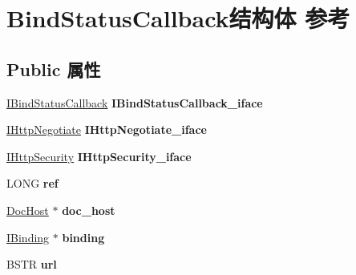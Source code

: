 \hypertarget{struct_bind_status_callback}{}\section{Bind\+Status\+Callback结构体 参考}
\label{struct_bind_status_callback}
\subsection*{Public 属性}
\begin{DoxyCompactItemize}
\item 
\mbox{\label{struct_bind_status_callback_a4fa12afa67f82f9e3957b86cefe82160}} 
\hyperlink{interface_i_bind_status_callback}{I\+Bind\+Status\+Callback} {\bfseries I\+Bind\+Status\+Callback\+\_\+iface}
\item 
\mbox{\label{struct_bind_status_callback_ac8dbbffa0fe5e1d6de41e267f44ee86f}} 
\hyperlink{interface_i_http_negotiate}{I\+Http\+Negotiate} {\bfseries I\+Http\+Negotiate\+\_\+iface}
\item 
\mbox{\label{struct_bind_status_callback_a9c670fb9b09c60c5a2f0c5e8b74bf806}} 
\hyperlink{interface_i_http_security}{I\+Http\+Security} {\bfseries I\+Http\+Security\+\_\+iface}
\item 
\mbox{\label{struct_bind_status_callback_a6089558dac69245bb320ac412165774d}} 
L\+O\+NG {\bfseries ref}
\item 
\mbox{\label{struct_bind_status_callback_ae72f26ee01a1c1008eeeed597d35375d}} 
\hyperlink{struct_doc_host}{Doc\+Host} $\ast$ {\bfseries doc\+\_\+host}
\item 
\mbox{\label{struct_bind_status_callback_ace172e999c538e88a9bf5749537662a4}} 
\hyperlink{interface_i_binding}{I\+Binding} $\ast$ {\bfseries binding}
\item 
\mbox{\label{struct_bind_status_callback_af26474b3435c76cde1dd5172c073cf56}} 
B\+S\+TR {\bfseries url}
\item 
\mbox{\label{struct_bind_status_callback_a7ec5e5c55ea73dd6a18ade8b82236975}} 

\end{DoxyCompactItemize}
